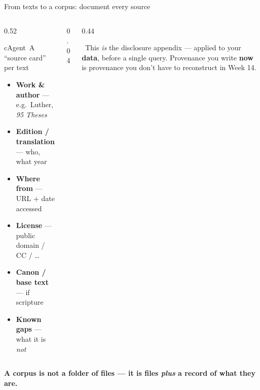 \begin{frame}{From texts to a corpus: document every source}
  \begin{columns}[c, totalwidth=\textwidth]
    \begin{column}{0.52\textwidth}
      \begin{featbox}{cAgent}{\faIdCard\ A ``source card'' per text}
        \scriptsize
        \begin{itemize}
          \item \textbf{Work \& author} --- e.g.\ Luther, \emph{95 Theses}
          \item \textbf{Edition / translation} --- who, what year
          \item \textbf{Where from} --- URL + date accessed
          \item \textbf{License} --- public domain / CC / \dots
          \item \textbf{Canon / base text} --- if scripture
          \item \textbf{Known gaps} --- what it is \emph{not}
        \end{itemize}
      \end{featbox}
    \end{column}
    \begin{column}{0.04\textwidth}\end{column}
    \begin{column}{0.44\textwidth}
      \begin{calloutbox}[cRAG]
        \small\faFileSignature\ This \emph{is} the disclosure appendix --- applied to
        your \textbf{data}, before a single query. Provenance you write \textbf{now} is
        provenance you don't have to reconstruct in Week 14.
      \end{calloutbox}
    \end{column}
  \end{columns}
  \vspace{4pt}
  \begin{center}\small\color{labnavy}\bfseries
    A corpus is not a folder of files --- it is files \emph{plus} a record of what they are.\end{center}
\end{frame}

